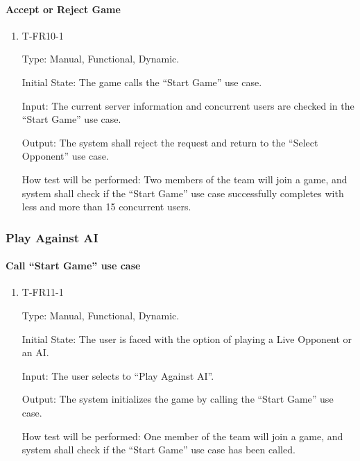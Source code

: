 \documentclass[12pt, titlepage]{article}
\begin{document}
    \paragraph{Accept or Reject Game}

        \begin{enumerate}

        \item{T-FR10-1\\}

            Type: Manual, Functional, Dynamic.
            					
            Initial State: The game calls the ``Start Game'' use case.
            					
            Input: The current server information and concurrent users are checked in the ``Start Game'' use case.
            					
            Output: The system shall reject
            the request and return to the ``Select Opponent” use case.

            How test will be performed: Two members of the team will join a game, and system shall check if the ``Start Game'' use case successfully completes with less and more than 15 concurrent users.

        \end{enumerate}

\subsubsection{Play Against AI}

    \paragraph{Call ``Start Game'' use case}

        \begin{enumerate}

        \item{T-FR11-1\\}

            Type: Manual, Functional, Dynamic.
            					
            Initial State: The user is faced with the option of playing a Live Opponent or an AI.
            					
            Input: The user selects to ``Play Against AI''.
            					
            Output: The system initializes the game by calling the ``Start Game'' use case.
            					
            How test will be performed: One member of the team will join a game, and system shall check if the ``Start Game'' use case has been called.

        \end{enumerate}
\end{document}
